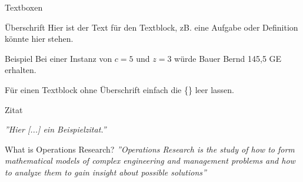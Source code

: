 \begin{frame}{Textboxen}
    \begin{block}{Überschrift}
        Hier ist der Text für den Textblock, zB. eine Aufgabe oder Definition könnte hier stehen.
    \end{block}  
    
    \begin{exampleblock}{Beispiel}
       Bei einer Instanz von $c=5$ und $z=3$ würde Bauer Bernd 145,5 GE erhalten.
    \end{exampleblock}
    
    \begin{exampleblock}{}
       Für einen Textblock ohne Überschrift einfach die \{\} leer lassen.
    \end{exampleblock}
    
\end{frame}


\begin{frame}{Zitat}
    \begin{block}{}
        {\textit{''Hier [...] ein Beispielzitat.''}} \\
        \hspace*{}
       
    \end{block}
    
    \begin{block}{What is Operations Research?}
        {\textit{''Operations Research is the study of how to form mathematical models of complex engineering and management problems and how to analyze them to gain insight about possible solutions''}} \\
        \hspace*{}
       
    \end{block}
\end{frame}